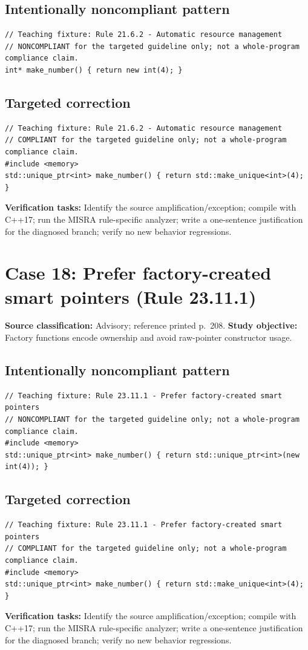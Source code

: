 \documentclass[10pt,letterpaper]{article}
\begin{document}
\subsection*{Intentionally noncompliant pattern}
\begin{lstlisting}
// Teaching fixture: Rule 21.6.2 - Automatic resource management
// NONCOMPLIANT for the targeted guideline only; not a whole-program compliance claim.
int* make_number() { return new int(4); }
\end{lstlisting}
\subsection*{Targeted correction}
\begin{lstlisting}
// Teaching fixture: Rule 21.6.2 - Automatic resource management
// COMPLIANT for the targeted guideline only; not a whole-program compliance claim.
#include <memory>
std::unique_ptr<int> make_number() { return std::make_unique<int>(4); }
\end{lstlisting}
\textbf{Verification tasks:} Identify the source amplification/exception; compile with C++17; run the MISRA rule-specific analyzer; write a one-sentence justification for the diagnosed branch; verify no new behavior regressions.

\section{Case 18: Prefer factory-created smart pointers (Rule 23.11.1)}
\textbf{Source classification:} Advisory; reference printed p.~208. \textbf{Study objective:} Factory functions encode ownership and avoid raw-pointer constructor usage.
\subsection*{Intentionally noncompliant pattern}
\begin{lstlisting}
// Teaching fixture: Rule 23.11.1 - Prefer factory-created smart pointers
// NONCOMPLIANT for the targeted guideline only; not a whole-program compliance claim.
#include <memory>
std::unique_ptr<int> make_number() { return std::unique_ptr<int>(new int(4)); }
\end{lstlisting}
\subsection*{Targeted correction}
\begin{lstlisting}
// Teaching fixture: Rule 23.11.1 - Prefer factory-created smart pointers
// COMPLIANT for the targeted guideline only; not a whole-program compliance claim.
#include <memory>
std::unique_ptr<int> make_number() { return std::make_unique<int>(4); }
\end{lstlisting}
\textbf{Verification tasks:} Identify the source amplification/exception; compile with C++17; run the MISRA rule-specific analyzer; write a one-sentence justification for the diagnosed branch; verify no new behavior regressions.
\end{document}
